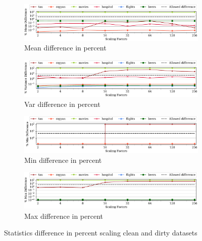 \begin{figure}[!ht]
    \centering 
    \centering
\begin{subfigure}{\textwidth}
    \includegraphics[width=\textwidth]{figures/plot/all_diff/mean_diff.pdf}
    \caption{Mean difference in percent}
    \label{exp:mean_diff_per}
\end{subfigure}
\hfill
\begin{subfigure}{\textwidth}
    \includegraphics[width=\textwidth]{figures/plot/all_diff/var_diff.pdf}
    \caption{Var difference in percent}
    \label{exp:var_diff_per}
\end{subfigure}
\hfill
\begin{subfigure}{\textwidth}
    \includegraphics[width=\textwidth]{figures/plot/all_diff/min_diff.pdf}
    \caption{Min difference in percent}
    \label{exp:min_diff_per}
\end{subfigure}
\hfill
\begin{subfigure}{\textwidth}
    \includegraphics[width=\textwidth]{figures/plot/all_diff/max_diff.pdf}
    \caption{Max difference in percent}
    \label{exp:max_diff_per}
\end{subfigure}
\hfill
\caption{Statistics difference in percent scaling clean and dirty datasets}
\label{exp:per_difference_datasets}
\end{figure}


